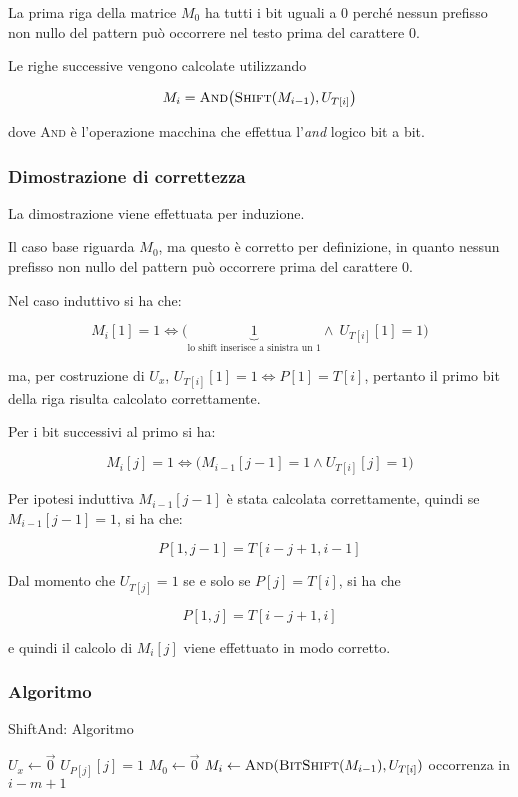 La prima riga della matrice $M_0$ ha tutti i bit uguali a 0 perché
nessun prefisso non nullo del pattern può occorrere nel testo prima del
carattere 0.

Le righe successive vengono calcolate utilizzando

$$M_i = \textsc{And}\big(\textsc{Shift}(M_{i-1}), U_{T[i]}\big) $$

dove \textsc{And} è l'operazione macchina che effettua l'\textit{and} logico bit
a bit.

\subsubsection{Dimostrazione di correttezza}\label{dimostrazione-di-correttezza}

La dimostrazione viene effettuata per induzione.

Il caso base riguarda $M_0$, ma questo è corretto per definizione, in quanto nessun prefisso non nullo del pattern può occorrere prima del carattere 0.

Nel caso induttivo si ha che:

$$M_i{[1]} = 1 \Leftrightarrow \big( \underbrace{1}_{\text{lo shift inserisce a sinistra un 1}} \wedge\: U_{T[i]}[1] = 1  \big)$$

ma, per costruzione di $ U_x $, $U_{T[i]}[1] = 1 \Leftrightarrow P[1] = T[i] $, pertanto il primo bit della riga risulta calcolato correttamente. 

Per i bit successivi al primo si ha:

$$
M_i[j] = 1 \Leftrightarrow \big( M_{i-1}[j-1] = 1 \wedge U_{T[i]}[j] = 1 \big)
$$

Per ipotesi induttiva $M_{i-1}[j-1]$ è stata calcolata correttamente, quindi se $M_{i-1}[j-1] = 1$, si ha che:

$$
P[1, j-1] = T[i -j +1, i-1]
$$

Dal momento che $U_{T[j]} = 1$ se e solo se $P[j] =T[i]$, si ha che

$$
P[1,j] = T[i-j+1,i]
$$

e quindi il calcolo di $M_{i}[j]$ viene effettuato in modo
corretto.

\subsubsection{Algoritmo}\label{algoritmo}

\begin{breakablealgorithm}
	\caption{ShiftAnd: Algoritmo }
	\begin{algorithmic}[1]
        \State $ U_x \gets \vec{0} $
    \EndFor
        \State $U_{P[j]}[j] =1$
    \EndFor
    \State $M_0 \gets \vec{0}$
        \State $M_i \gets \text{\textsc{And}}(\text{\textsc{BitShift}}(M_{i-1}), U_{T[i]})$
            \State occorrenza in $i -m +1$
        \EndIf
    \EndFor
\EndFunction
\end{algorithmic}
\end{breakablealgorithm}


